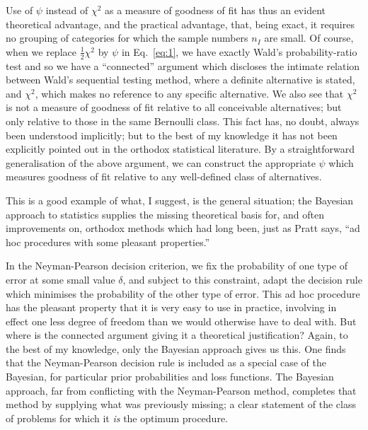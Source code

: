 \documentclass[12pt]{article}
\newcommand{\refeq}[1]{Eq.~\ref{#1}}
\begin{document}
Use of $\psi$ instead of $\chi^2$ as a measure of goodness of fit has thus an evident theoretical advantage, and the practical advantage, that, being exact, it requires no grouping of categories for which the sample numbers $n_I$ are small. Of course, when we replace $\frac12 \chi^2$ by $\psi$ in \refeq{eq:1}, we have exactly Wald's probability-ratio test and so we have a ``connected'' argument which discloses the intimate relation between Wald's sequential testing method, where a definite alternative is stated, and $\chi^2$, which makes no reference to any specific alternative. We also see that $\chi^2$ is not a measure of goodness of fit relative to all conceivable alternatives; but only relative to those in the same Bernoulli class. This fact has, no doubt, always been understood implicitly; but to the best of my knowledge it has not been explicitly pointed out in the orthodox statistical literature. By a straightforward generalisation of the above
argument, we can construct the appropriate $\psi$ which measures goodness of fit relative to any well-defined class of alternatives.

This is a good example of what, I suggest, is the general situation;
the Bayesian approach to statistics supplies the missing theoretical
basis for, and often improvements on, orthodox methods which had long
been, just as Pratt says, ``ad hoc procedures with some pleasant
properties.''

In the Neyman-Pearson decision criterion, we fix the probability
of one type of error at some small value $\delta$, and subject to this constraint, adapt the decision rule which minimises the probability
of the other type of error. This ad hoc procedure has the pleasant
property that it is very easy to use in practice, involving in effect
one less degree of freedom than we would otherwise have to deal with.
But where is the connected argument giving it a theoretical justification?
Again, to the best of my knowledge, only the Bayesian approach gives us
this. One finds that the Neyman-Pearson decision rule is included as a
special case of the Bayesian, for particular prior probabilities and
loss functions. The Bayesian approach, far from conflicting with the
Neyman-Pearson method, completes that method by supplying what was
previously missing; a clear statement of the class of problems for
which it \emph{is} the optimum procedure.
\end{document}
